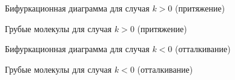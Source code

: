 \begin{figure}[h]
  \caption{Бифуркационная диаграмма для случая $k>0$ (притяжение)} \label{void}
\end{figure}

\begin{figure}[h]
  \caption{Грубые молекулы для случая $k>0$ (притяжение)}\label{void}
\end{figure}

\begin{figure}[h]
  \caption{Бифуркационная диаграмма для случая $k<0$ (отталкивание)}\label{void}
\end{figure}

\begin{figure}[h]
  \caption{Грубые молекулы для случая $k<0$ (отталкивание)}\label{void}
\end{figure}

